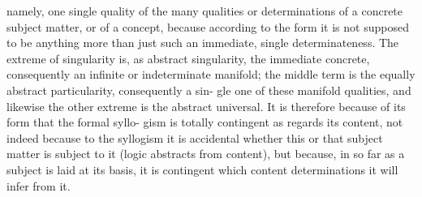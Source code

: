 namely, one single quality of the many qualities or determinations of a
concrete subject matter, or of a concept, because according to the form it
is not supposed to be anything more than just such an immediate, single
determinateness. The extreme of singularity is, as abstract singularity, the
immediate concrete, consequently an infinite or indeterminate manifold;
the middle term is the equally abstract particularity, consequently a sin-
gle one of these manifold qualities, and likewise the other extreme is the
abstract universal. It is therefore because of its form that the formal syllo-
gism is totally contingent as regards its content, not indeed because to the
syllogism it is accidental whether this or that subject matter is subject to it
(logic abstracts from content), but because, in so far as a subject is laid at
its basis, it is contingent which content determinations it will infer from it.

